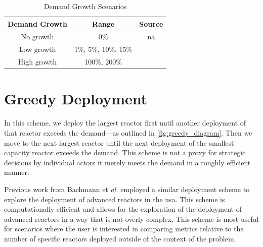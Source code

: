 \begin{table}[htbp]
    \centering
    \caption{Demand Growth Scenarios}
    \label{tab:demand_scenarios}
    \begin{tabular}{c c c}
        \hline
        \textbf{Demand Growth} & \textbf{Range} & \textbf{Source}\\
        \hline
 No growth & 0\% & na\\
 Low growth & 1\%, 5\%, 10\%, 15\% & \cite{eia_aeo_2023}\\
 High growth & 100\%, 200\% & \cite{julie_liftoff_pathways_2024}\\
        \hline
    \end{tabular}
\end{table}

\section{Greedy Deployment}
\label{sec:greedy_deployment}

In this scheme, we deploy the largest reactor first until another
deployment of that reactor exceeds the demand---as outlined in
\ref{fig:greedy_diagram}. Then we move to the next largest reactor until the
next deployment of the smallest capacity reactor exceeds the
demand. This scheme is not a proxy for strategic decisions by individual
actors it merely meets the demand in a roughly efficient manner.

Previous work from Bachmann et \textit{al.} \cite{bachmann_enrichment_2021}
employed a similar deployment scheme to explore the deployment of advanced
reactors in the \gls{usa}. This scheme is computationally efficient and allows
for the exploration of the deployment of advanced reactors in a way that is not
overly complex. This scheme is most useful for scenarios where the user is
interested in comparing metrics relative to the number of specific reactors
deployed outside of the context of the problem.

